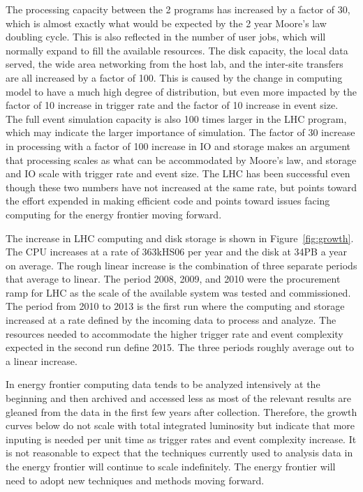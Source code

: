 The processing capacity between the 2 programs has increased by a
factor of 30, which is almost exactly what would be expected by the 2
year Moore's law doubling cycle.  This is also reflected in the number
of user jobs, which will normally expand to fill the available
resources.  The disk capacity, the local data served, the wide area
networking from the host lab, and the inter-site transfers are all
increased by a factor of 100.  This is caused by the change in
computing model to have a much high degree of distribution, but even
more impacted by the factor of 10 increase in trigger rate and the
factor of 10 increase in event size.  The full event simulation
capacity is also 100 times larger in the LHC program, which may
indicate the larger importance of simulation.  The factor of 30
increase in processing with a factor of 100 increase in IO and storage
makes an argument that processing scales as what can be accommodated
by Moore's law, and storage and IO scale with trigger rate and event
size.  The LHC has been successful even though these two numbers have
not increased at the same rate, but points toward the effort expended
in making efficient code and points toward issues facing computing for
the energy frontier moving forward.

The increase in LHC computing and disk storage is shown in
Figure~\ref{fig:growth}.  The CPU increases at a rate of 363kHS06 per
year and the disk at 34PB a year on average.  The rough linear
increase is the combination of three separate periods that average to
linear.  The period 2008, 2009, and 2010 were the procurement ramp for
LHC as the scale of the available system was tested and commissioned.
The period from 2010 to 2013 is the first run where the computing and
storage increased at a rate defined by the incoming data to process
and analyze.  The resources needed to accommodate the higher trigger
rate and event complexity expected in the second run define 2015.  The
three periods roughly average out to a linear increase.

In energy frontier computing data tends to be analyzed intensively at
the beginning and then archived and accessed less as most of the
relevant results are gleaned from the data in the first few years
after collection.  Therefore, the growth curves below do not scale
with total integrated luminosity but indicate that more inputing is
needed per unit time as trigger rates and event complexity increase.
It is not reasonable to expect that the techniques currently used to
analysis data in the energy frontier will continue to scale
indefinitely.  The energy frontier will need to adopt new techniques
and methods moving forward.


